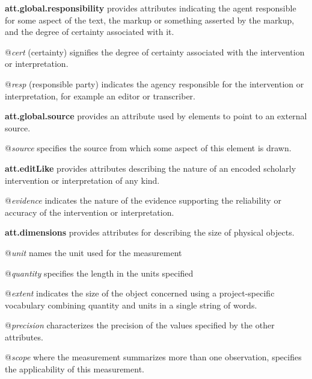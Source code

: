\begin{sansreflist}
  
\item [\textbf{att.global.responsibility}] provides attributes indicating the agent responsible for some aspect of the text, the markup or something asserted by the markup, and the degree of certainty associated with it.\hfil\\[-10pt]\begin{sansreflist}
    \item[@{\itshape cert}]
  (certainty) signifies the degree of certainty associated with the intervention or interpretation.
    \item[@{\itshape resp}]
  (responsible party) indicates the agency responsible for the intervention or interpretation, for example an editor or transcriber.
\end{sansreflist}  
\item [\textbf{att.global.source}] provides an attribute used by elements to point to an external source.\hfil\\[-10pt]\begin{sansreflist}
    \item[@{\itshape source}]
  specifies the source from which some aspect of this element is drawn.
\end{sansreflist}  
\item [\textbf{att.editLike}] provides attributes describing the nature of an encoded scholarly intervention or interpretation of any kind.\hfil\\[-10pt]\begin{sansreflist}
    \item[@{\itshape evidence}]
  indicates the nature of the evidence supporting the reliability or accuracy of the intervention or interpretation.
\end{sansreflist}  
\item [\textbf{att.dimensions}] provides attributes for describing the size of physical objects.\hfil\\[-10pt]\begin{sansreflist}
    \item[@{\itshape unit}]
  names the unit used for the measurement
    \item[@{\itshape quantity}]
  specifies the length in the units specified
    \item[@{\itshape extent}]
  indicates the size of the object concerned using a project-specific vocabulary combining quantity and units in a single string of words.
    \item[@{\itshape precision}]
  characterizes the precision of the values specified by the other attributes.
    \item[@{\itshape scope}]
  where the measurement summarizes more than one observation, specifies the applicability of this measurement.
\end{sansreflist}  
\end{sansreflist}

